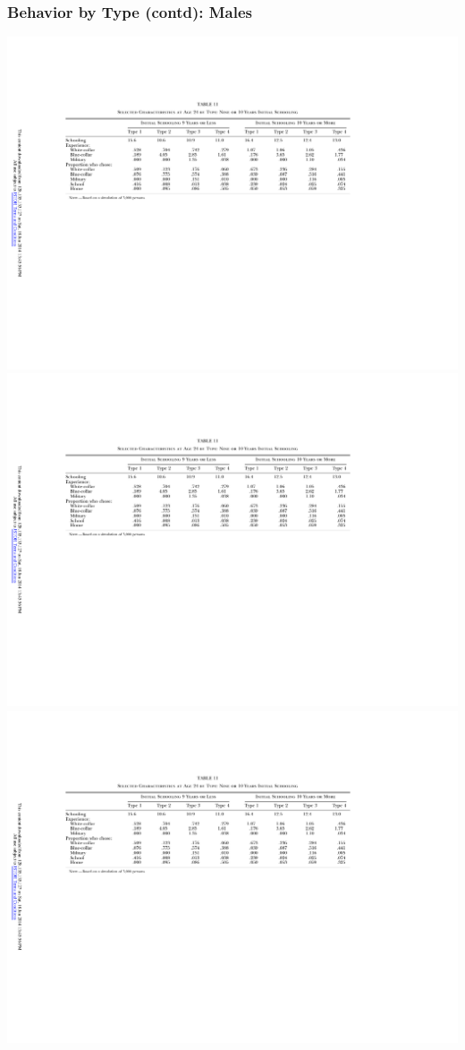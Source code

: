 \begin{frame}
	\frametitle{Behavior by Type (contd): Males}
	\includegraphics[width=\textwidth]{tab-figs/table11_1997_header}	\\
	\includegraphics{tab-figs/table11_1997_left}  \includegraphics{tab-figs/table11b_1997}	\\	

\end{frame}
